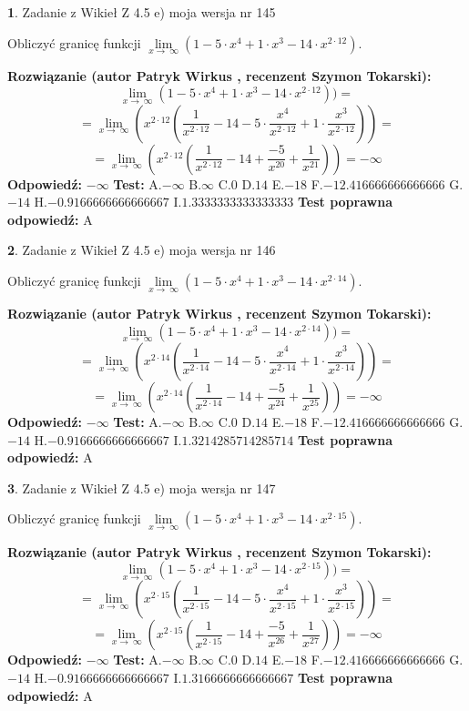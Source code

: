 \documentclass[12pt, a4paper]{article}
\theoremstyle{definition} %
\newtheorem{zad}{}
\newcommand{\zadStart}[1]{\begin{zad}#1\newline}
\newcommand{\zadStop}{\end{zad}}
\newcommand{\rozwStart}[2]{\noindent \textbf{Rozwiązanie (autor #1 , recenzent #2): }\newline}
\newcommand{\rozwStop}{\newline}
\newcommand{\odpStart}{\noindent \textbf{Odpowiedź:}\newline}
\newcommand{\odpStop}{\newline}
\newcommand{\testStart}{\noindent \textbf{Test:}\newline}
\newcommand{\testStop}{\newline}
\newcommand{\kluczStart}{\noindent \textbf{Test poprawna odpowiedź:}\newline}
\newcommand{\kluczStop}{\newline}
\begin{document}
\zadStart{Zadanie z Wikieł Z 4.5 e) moja wersja nr 145}


Obliczyć granicę funkcji  $\lim\limits_{x\to\ \infty}(1 - 5 \cdot x^{4}+1 \cdot x^{3}- 14 \cdot x^{2\cdot12})$.
\zadStop
\rozwStart{Patryk Wirkus}{Szymon Tokarski}
$$\lim\limits_{x\to\ \infty}(1 - 5 \cdot x^{4}+1 \cdot x^{3}- 14 \cdot x^{2\cdot12}))=$$
$$=\lim\limits_{x\to\ \infty}(x^{2\cdot12}(\frac{1}{x^{2\cdot12}}-14 -5 \cdot \frac{x^{4}}{x^{2\cdot12}}+1 \cdot \frac{x^{3}}{x^{2\cdot12}}))=$$
$$=\lim\limits_{x\to\ \infty}(x^{2\cdot12}(\frac{1}{x^{2\cdot12}}-14 + \frac{-5}{x^{20}}+ \frac{1}{x^{21}}))=-\infty$$
\rozwStop
\odpStart
$-\infty$
\odpStop
\testStart
A.$-\infty$ B.$\infty$ C.$0$ D.$14$ E.$-18$
F.$-12.416666666666666$ G.$-14$
H.$-0.9166666666666667$
I.$1.3333333333333333$
\testStop
\kluczStart
A
\kluczStop



\zadStart{Zadanie z Wikieł Z 4.5 e) moja wersja nr 146}


Obliczyć granicę funkcji  $\lim\limits_{x\to\ \infty}(1 - 5 \cdot x^{4}+1 \cdot x^{3}- 14 \cdot x^{2\cdot14})$.
\zadStop
\rozwStart{Patryk Wirkus}{Szymon Tokarski}
$$\lim\limits_{x\to\ \infty}(1 - 5 \cdot x^{4}+1 \cdot x^{3}- 14 \cdot x^{2\cdot14}))=$$
$$=\lim\limits_{x\to\ \infty}(x^{2\cdot14}(\frac{1}{x^{2\cdot14}}-14 -5 \cdot \frac{x^{4}}{x^{2\cdot14}}+1 \cdot \frac{x^{3}}{x^{2\cdot14}}))=$$
$$=\lim\limits_{x\to\ \infty}(x^{2\cdot14}(\frac{1}{x^{2\cdot14}}-14 + \frac{-5}{x^{24}}+ \frac{1}{x^{25}}))=-\infty$$
\rozwStop
\odpStart
$-\infty$
\odpStop
\testStart
A.$-\infty$ B.$\infty$ C.$0$ D.$14$ E.$-18$
F.$-12.416666666666666$ G.$-14$
H.$-0.9166666666666667$
I.$1.3214285714285714$
\testStop
\kluczStart
A
\kluczStop



\zadStart{Zadanie z Wikieł Z 4.5 e) moja wersja nr 147}


Obliczyć granicę funkcji  $\lim\limits_{x\to\ \infty}(1 - 5 \cdot x^{4}+1 \cdot x^{3}- 14 \cdot x^{2\cdot15})$.
\zadStop
\rozwStart{Patryk Wirkus}{Szymon Tokarski}
$$\lim\limits_{x\to\ \infty}(1 - 5 \cdot x^{4}+1 \cdot x^{3}- 14 \cdot x^{2\cdot15}))=$$
$$=\lim\limits_{x\to\ \infty}(x^{2\cdot15}(\frac{1}{x^{2\cdot15}}-14 -5 \cdot \frac{x^{4}}{x^{2\cdot15}}+1 \cdot \frac{x^{3}}{x^{2\cdot15}}))=$$
$$=\lim\limits_{x\to\ \infty}(x^{2\cdot15}(\frac{1}{x^{2\cdot15}}-14 + \frac{-5}{x^{26}}+ \frac{1}{x^{27}}))=-\infty$$
\rozwStop
\odpStart
$-\infty$
\odpStop
\testStart
A.$-\infty$ B.$\infty$ C.$0$ D.$14$ E.$-18$
F.$-12.416666666666666$ G.$-14$
H.$-0.9166666666666667$
I.$1.3166666666666667$
\testStop
\kluczStart
A
\kluczStop
\end{document}
